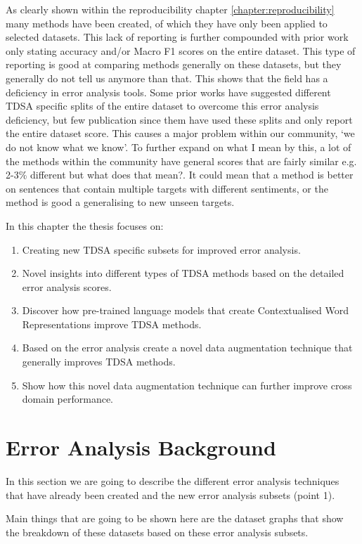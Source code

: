 As clearly shown within the reproducibility chapter \ref{chapter:reproducibility} many methods have been created, of which they have only been applied to selected datasets. This lack of reporting is further compounded with prior work only stating accuracy and/or Macro F1 scores on the entire dataset. This type of reporting is good at comparing methods generally on these datasets, but they generally do not tell us anymore than that. This shows that the field has a deficiency in error analysis tools. Some prior works have suggested different TDSA specific splits of the entire dataset to overcome this error analysis deficiency, but few publication since them have used these splits and only report the entire dataset score. This causes a major problem within our community, `we do not know what we know'. To further expand on what I mean by this, a lot of the methods within the community have general scores that are fairly similar e.g. 2-3\% different but what does that mean?. It could mean that a method is better on sentences that contain multiple targets with different sentiments, or the method is good a generalising to new unseen targets.


In this chapter the thesis focuses on:
\begin{enumerate}
    \item Creating new TDSA specific subsets for improved error analysis.
    \item Novel insights into different types of TDSA methods based on the detailed error analysis scores.
    \item Discover how pre-trained language models that create Contextualised Word Representations improve TDSA methods.
    \item Based on the error analysis create a novel data augmentation technique that generally improves TDSA methods.
    \item Show how this novel data augmentation technique can further improve cross domain performance.
\end{enumerate}

\section{Error Analysis Background}
In this section we are going to describe the different error analysis techniques that have already been created and the new error analysis subsets (point 1).

Main things that are going to be shown here are the dataset graphs that show the breakdown of these datasets based on these error analysis subsets.

